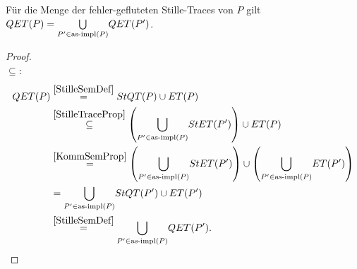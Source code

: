 \begin{Prop}
  \label{StilleSemProp}
  Für die Menge der fehler-gefluteten Stille-Traces von $P$ gilt $QET (P) =
  \underset{P'\in\mathrm{as}\text{-}\mathrm{impl} (P)}{\bigcup} QET (P')$.
\end{Prop}
\begin{proof}\mbox{}\\
  \glqq$\subseteq$\grqq{}:
  \begin{align*}
    QET (P)&\overset{\ref{StilleSemDef}}{=} StQT (P) \cup ET (P)\\
    &\overset{\ref{StilleTraceProp}}{\subseteq} \left(\underset{P'\in\mathrm{as}\text{-}\mathrm{impl}
    (P)}{\bigcup} StET (P')\right)\cup ET (P)\\
    &\overset{\ref{KommSemProp}}{=} \left(\underset{P'\in\mathrm{as}\text{-}\mathrm{impl}
    (P)}{\bigcup} StET (P')\right)\cup \left(\underset{P'\in\mathrm{as}\text{-}\mathrm{impl}
    (P)}{\bigcup} ET (P')\right)\\
    &= \underset{P'\in\mathrm{as}\text{-}\mathrm{impl} (P)}{\bigcup} StQT (P') \cup ET (P')\\
    &\overset{\ref{StilleSemDef}}{=} \underset{P'\in\mathrm{as}\text{-}\mathrm{impl} (P)}{\bigcup} QET
    (P').\\
  \end{align*}


\end{proof}
